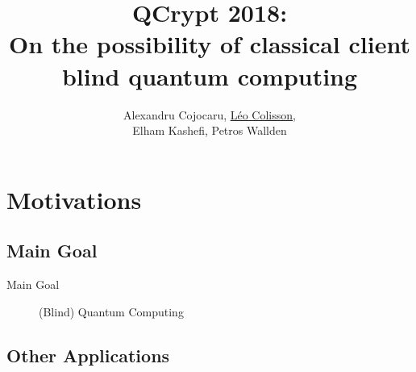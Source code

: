 \documentclass[]{beamer}
\title[QFactory and classical blind quantum computing]{QCrypt 2018:\\On the possibility of classical client blind quantum computing}
\author[A. Cojocaru, L. Colisson, E. Kashefi, P. Wallden]{Alexandru Cojocaru, \underline{Léo Colisson},\\ Elham Kashefi, Petros Wallden}
\begin{document}

\begin{frame}
  \titlepage
\end{frame}

\begin{frame}
  \tableofcontents
\end{frame}


\section{Motivations}

\subsection{Main Goal}

\begin{frame}{Main Goal}
  \begin{figure}[ht]
    \centering
    \caption{(Blind) Quantum Computing}
  \end{figure}
\end{frame}

\subsection{Other Applications}
\end{document}
